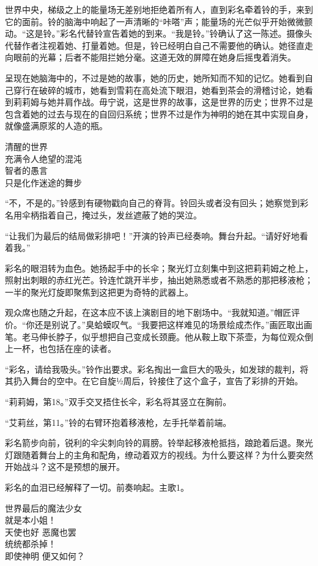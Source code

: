世界中央，梯级之上的能量场无差别地拒绝着所有人，直到彩名牵着铃的手，来到它的面前。铃的脑海中响起了一声清晰的“咔嗒”声；能量场的光芒似乎开始微微颤动。“这是铃。”彩名代替铃宣告着她的到来。“我是铃。”铃确认了这一陈述。摄像头代替作者注视着她、打量着她。但是，铃已经明白自己不需要他的确认。她径直走向眼前的光幕；后者不能阻拦她分毫。这道无效的屏障在她身后摇曳着消失。

呈现在她脑海中的，不过是她的故事，她的历史，她所知而不知的记忆。她看到自己穿行在破碎的城市，她看到雪莉在高处流下眼泪，她看到茶会的滑稽讨论，她看到莉莉姆与她并肩作战。毋宁说，这是世界的故事，这是世界的历史；世界不过是包含着她的过去与现在的自回归系统；世界不过是作为神明的她在其中实现自身，就像盛满原浆的人造的瓶。
\begin{song}
清醒的世界\\
充满令人绝望的混沌\\
智者的愚言\\
只是化作迷途的舞步
\end{song}

“不，不是的。”铃感到有硬物戳向自己的脊背。铃回头或者没有回头；她察觉到彩名用伞柄指着自己，掩过头，发丝遮蔽了她的哭泣。

“让我们为最后的结局做彩排吧！”开演的铃声已经奏响。舞台升起。“请好好地看着我。”

彩名的眼泪转为血色。她扬起手中的长伞；聚光灯立刻集中到这把莉莉姆之枪上，照射出刺眼的赤红光芒。铃连忙跳开半步，抽出她熟悉或者不熟悉的那把移液枪；一半的聚光灯旋即聚焦到这把更为奇特的武器上。

观众席也随之升起，在这本应不该上演剧目的地下剧场中。“我就知道。”帽匠评价。“你还是别说了。”臭蛤蟆叹气。“我要把这样难见的场景绘成杰作。”画匠取出画笔。老马伸长脖子，似乎想把自己变成长颈鹿。他从鞍上取下茶壶，为每位观众倒上一杯，也包括在座的读者。

“彩名，请给我吸头。”铃作出要求。彩名掏出一盒巨大的吸头，如发球的裁判，将其扔入舞台的空中。在它自旋½周后，铃接住了这个盒子，宣告了彩排的开始。

“莉莉姆，第18。”双手交叉捂住长伞，彩名将其竖立在胸前。

“艾莉丝，第11。”铃的右臂环抱着移液枪，左手托举着前端。

彩名箭步向前，锐利的伞尖刺向铃的肩膀。铃举起移液枪抵挡，踉跄着后退。聚光灯跟随着舞台上的主角和配角，缭动着双方的视线。为什么要这样？为什么要突然开始战斗？这不是预想的展开。

彩名的血泪已经解释了一切。前奏响起。主歌1。
\begin{song}
世界最后的魔法少女\\
就是本小姐！\\
天使也好 恶魔也罢\\
统统都杀掉！\\
即使神明 便又如何？
\end{song}

